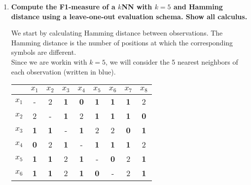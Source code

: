\documentclass[12pt]{article}
\begin{document}
\vspace{10pt}
\begin{enumerate}[leftmargin=\labelsep]
    \item \textbf{Compute the F1-measure of a $k$NN with $k =  5$ and Hamming distance using a
    leave-one-out evaluation schema. Show all calculus.}

    \vspace{10pt}
    We start by calculating Hamming distance between observations. The Hamming distance is the number of positions at which the corresponding symbols are different.\\
    Since we are workin with $k = 5$, we will consider the 5 nearest neighbors of each observation (written in blue).
    \vspace{10pt}
    
    \begin{table}[H]
        \begin{center}
            \begin{tabular}{c|cccccccc}
            & $x_1$ & $x_2$ & $x_3$ & $x_4$ & $x_5$ & $x_6$ & $x_7$ & $x_8$\\ 
            \hline
                $x_1$ & \-- & 2 & \textbf{\textcolor{codeblue}{1}} & \textbf{\textcolor{codeblue}{0}} & \textbf{\textcolor{codeblue}{1}} & \textbf{\textcolor{codeblue}{1}} & \textbf{\textcolor{codeblue}{1}} & 2 \\ 
                $x_2$ & 2 & \-- & \textbf{\textcolor{codeblue}{1}} & 2 & \textbf{\textcolor{codeblue}{1}} & \textbf{\textcolor{codeblue}{1}} & \textbf{\textcolor{codeblue}{1}} & \textbf{\textcolor{codeblue}{0}} \\ 
                $x_3$ & \textbf{\textcolor{codeblue}{1}} & \textbf{\textcolor{codeblue}{1}} & \-- & \textbf{\textcolor{codeblue}{1}} & 2 & 2 & \textbf{\textcolor{codeblue}{0}} & \textbf{\textcolor{codeblue}{1}} \\ 
                $x_4$ & \textbf{\textcolor{codeblue}{0}} & 2 & \textbf{\textcolor{codeblue}{1}} & \-- & \textbf{\textcolor{codeblue}{1}} & \textbf{\textcolor{codeblue}{1}} & \textbf{\textcolor{codeblue}{1}} & 2 \\ 
                $x_5$ & \textbf{\textcolor{codeblue}{1}} & \textbf{\textcolor{codeblue}{1}} & 2 & \textbf{\textcolor{codeblue}{1}} & \-- & \textbf{\textcolor{codeblue}{0}} & 2 & \textbf{\textcolor{codeblue}{1}} \\ 
                $x_6$ & \textbf{\textcolor{codeblue}{1}} & \textbf{\textcolor{codeblue}{1}} & 2 & \textbf{\textcolor{codeblue}{1}} & \textbf{\textcolor{codeblue}{0}} & \-- & 2 & \textbf{\textcolor{codeblue}{1}} \\ 

\end{tabular}
\end{center}
\end{table}
\end{enumerate}
\end{document}
